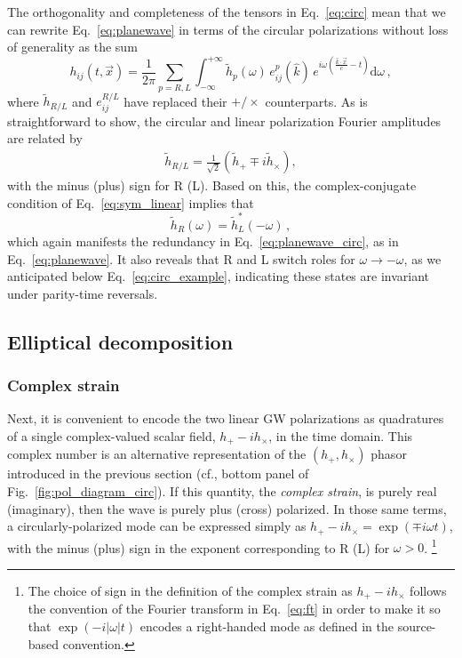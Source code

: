 \documentclass[aps,prd,twocolumn,superscriptaddress,preprintnumbers,floatfix,nofootinbib]{revtex4-2}
\newcommand{\beq}{\begin{equation}}
\newcommand{\eeq}{\end{equation}}
\newcommand{\infd}{\mathrm{d}}
\begin{document}
The orthogonality and completeness of the tensors in Eq.~\eqref{eq:circ} mean that we can rewrite Eq.~\eqref{eq:planewave} in terms of the circular polarizations without loss of generality as the sum
\beq \label{eq:planewave_circ}
h_{ij}(t,\vec{x}) 
= \frac{1}{2\pi} \sum_{p=R,L} \int_{-\infty}^{+\infty} \tilde{h}_p(\omega)\, e^p_{ij}(\hat{k})\, e^{i\omega \left(\frac{\hat{k}\cdot\vec{x}}{c}-t\right)} \infd \omega \, ,
\eeq
where $\tilde{h}_{R/L}$ and $e^{R/L}_{ij}$ have replaced their $+/\times$ counterparts.
As is straightforward to show, the circular and linear polarization Fourier amplitudes are related by
\begin{align} \label{eq:circ_amps}
\tilde{h}_{R/L} = \frac{1}{\sqrt{2}} \left(\tilde{h}_+ \mp i\tilde{h}_\times \right) ,
\end{align}
with the minus (plus) sign for R (L).
Based on this, the complex-conjugate condition of Eq.~\eqref{eq:sym_linear} implies that
\beq \label{eq:sym_circular}
\tilde{h}_R(\omega) = \tilde{h}_L^*(-\omega) \, ,
\eeq
which again manifests the redundancy in Eq.~\eqref{eq:planewave_circ}, as in Eq.~\eqref{eq:planewave}.
It also reveals that R and L switch roles for $\omega \to - \omega$, as we anticipated below Eq.~\eqref{eq:circ_example}, indicating these states are invariant under parity-time reversals.


\subsection{Elliptical decomposition}
\label{sec:ellip}

\subsubsection{Complex strain}

Next, it is convenient to encode the two linear GW polarizations as quadratures of a single complex-valued scalar field, $h_+ - i h_\times$, in the time domain.
This complex number is an alternative representation of the $\left(h_+, h_\times\right)$ phasor introduced in the previous section (cf., bottom panel of Fig.~\ref{fig:pol_diagram_circ}).
If this quantity, the \emph{complex strain}, is purely real (imaginary), then the wave is purely plus (cross) polarized.
In those same terms, a circularly-polarized mode can be expressed simply as $h_+ - i h_\times = \exp(\mp i \omega t)$, with the minus (plus) sign in the exponent corresponding to R (L) for $\omega > 0$.%
\footnote{The choice of sign in the definition of the complex strain as $h_+ - ih_\times$ follows the convention of the Fourier transform in Eq.~\eqref{eq:ft} in order to make it so that $\exp(-i|\omega| t)$ encodes a right-handed mode as defined in the source-based convention.}
\end{document}

